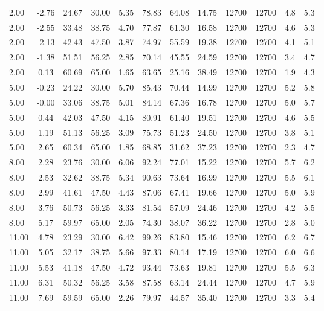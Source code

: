 \documentclass[english]{SPFShortReport}
\begin{document}
\begin{table}[!ht]
\begin{small}
\begin{center}
{\begin{tabular}{l | c c c c c c c c c c c }
2.00 & -2.76 & 24.67 & 30.00 & 5.35 & 78.83 & 64.08 & 14.75 & 12700 & 12700 & 4.8 & 5.3\\ 
2.00 & -2.55 & 33.48 & 38.75 & 4.70 & 77.87 & 61.30 & 16.58 & 12700 & 12700 & 4.6 & 5.3\\ 
2.00 & -2.13 & 42.43 & 47.50 & 3.87 & 74.97 & 55.59 & 19.38 & 12700 & 12700 & 4.1 & 5.1\\ 
2.00 & -1.38 & 51.51 & 56.25 & 2.85 & 70.14 & 45.55 & 24.59 & 12700 & 12700 & 3.4 & 4.7\\ 
2.00 & 0.13 & 60.69 & 65.00 & 1.65 & 63.65 & 25.16 & 38.49 & 12700 & 12700 & 1.9 & 4.3\\ 
5.00 & -0.23 & 24.22 & 30.00 & 5.70 & 85.43 & 70.44 & 14.99 & 12700 & 12700 & 5.2 & 5.8\\ 
5.00 & -0.00 & 33.06 & 38.75 & 5.01 & 84.14 & 67.36 & 16.78 & 12700 & 12700 & 5.0 & 5.7\\ 
5.00 & 0.44 & 42.03 & 47.50 & 4.15 & 80.91 & 61.40 & 19.51 & 12700 & 12700 & 4.6 & 5.5\\ 
5.00 & 1.19 & 51.13 & 56.25 & 3.09 & 75.73 & 51.23 & 24.50 & 12700 & 12700 & 3.8 & 5.1\\ 
5.00 & 2.65 & 60.34 & 65.00 & 1.85 & 68.85 & 31.62 & 37.23 & 12700 & 12700 & 2.3 & 4.7\\ 
8.00 & 2.28 & 23.76 & 30.00 & 6.06 & 92.24 & 77.01 & 15.22 & 12700 & 12700 & 5.7 & 6.2\\ 
8.00 & 2.53 & 32.62 & 38.75 & 5.34 & 90.63 & 73.64 & 16.99 & 12700 & 12700 & 5.5 & 6.1\\ 
8.00 & 2.99 & 41.61 & 47.50 & 4.43 & 87.06 & 67.41 & 19.66 & 12700 & 12700 & 5.0 & 5.9\\ 
8.00 & 3.76 & 50.73 & 56.25 & 3.33 & 81.54 & 57.09 & 24.46 & 12700 & 12700 & 4.2 & 5.5\\ 
8.00 & 5.17 & 59.97 & 65.00 & 2.05 & 74.30 & 38.07 & 36.22 & 12700 & 12700 & 2.8 & 5.0\\ 
11.00 & 4.78 & 23.29 & 30.00 & 6.42 & 99.26 & 83.80 & 15.46 & 12700 & 12700 & 6.2 & 6.7\\ 
11.00 & 5.05 & 32.17 & 38.75 & 5.66 & 97.33 & 80.14 & 17.19 & 12700 & 12700 & 6.0 & 6.6\\ 
11.00 & 5.53 & 41.18 & 47.50 & 4.72 & 93.44 & 73.63 & 19.81 & 12700 & 12700 & 5.5 & 6.3\\ 
11.00 & 6.31 & 50.32 & 56.25 & 3.58 & 87.58 & 63.14 & 24.44 & 12700 & 12700 & 4.7 & 5.9\\ 
11.00 & 7.69 & 59.59 & 65.00 & 2.26 & 79.97 & 44.57 & 35.40 & 12700 & 12700 & 3.3 & 5.4\\ 

\end{tabular}}
\end{center}
\end{small}
\end{table}
\end{document}
